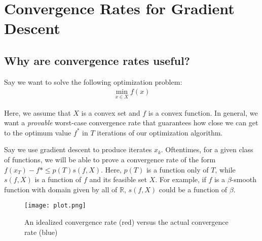 \documentclass[12pt]{report}
\def\real{\mathbb R}
\begin{document}

\maketitle






\section{Convergence Rates for Gradient Descent}

\subsection{Why are convergence rates useful?}

Say we want to solve the following optimization problem:
\begin{align*}
\min_{x \in X} f(x)\end{align*}

Here, we assume that $X$ is a convex set and $f$ is a convex function. In general, we want a {\it provable} worst-case convergence rate that guarantees how close we can get to the optimum value $f^*$ in $T$ iterations of our optimization algorithm.

\medskip

Say we use gradient descent to produce iterates $x_k$. Oftentimes, for a given class of functions, we will be able to prove a convergence rate of the form $f(x_T)-f* \leq p(T)s(f,X)$. Here, $p(T)$ is a function only of $T$, while $s(f,X)$ is a function of $f$ and its feasible set $X$. For example, if $f$ is a $\beta$-smooth function with domain given by all of $\real$, $s(f,X)$ could be a function of $\beta$.

\begin{figure}[H]
\centering
\texttt{[image: plot.png]}
\caption{An idealized convergence rate (red) versus the actual convergence rate (blue)}
\end{figure}
\end{document}
